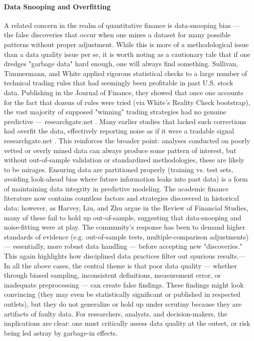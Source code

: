 \documentclass{article}
\begin{document}
\begin{appendices}
\paragraph{Data Snooping and Overfitting}
A related concern in the realm of quantitative finance is data-snooping bias --- the false discoveries that occur when one mines a dataset for many possible patterns without proper adjustment. While this is more of a methodological issue than a data quality issue per se, it is worth noting as a cautionary tale that if one dredges "garbage data" hard enough, one will always find something. Sullivan, Timmermann, and White \cite{Sullivan1999} applied rigorous statistical checks to a large number of technical trading rules that had seemingly been profitable in past U.S. stock data. Publishing in the Journal of Finance, they showed that once one accounts for the fact that dozens of rules were tried (via White's Reality Check bootstrap), the vast majority of supposed "winning" trading strategies had no genuine predictive ---
researchgate.net
. Many earlier studies that lacked such corrections had overfit the data, effectively reporting noise as if it were a tradable signal
researchgate.net
. This reinforces the broader point: analyses conducted on poorly vetted or overly mined data can always produce some pattern of interest, but without out-of-sample validation or standardized methodologies, these are likely to be mirages. Ensuring data are partitioned properly (training vs. test sets, avoiding look-ahead bias where future information leaks into past data) is a form of maintaining data integrity in predictive modeling. The academic finance literature now contains countless factors and strategies discovered in historical data; however, as Harvey, Liu, and Zhu \cite{Harvey2016} argue in the Review of Financial Studies, many of these fail to hold up out-of-sample, suggesting that data-snooping and noise-fitting were at play. The community's response has been to demand higher standards of evidence (e.g. out-of-sample tests, multiple-comparison adjustments) --- essentially, more robust data handling --- before accepting new "discoveries." This again highlights how disciplined data practices filter out spurious results.---
In all the above cases, the central theme is that poor data quality --- whether through biased sampling, inconsistent definitions, measurement error, or inadequate preprocessing --- can create false findings. These findings might look convincing (they may even be statistically significant or published in respected outlets), but they do not generalize or hold up under scrutiny because they are artifacts of faulty data. For researchers, analysts, and decision-makers, the implications are clear: one must critically assess data quality at the outset, or risk being led astray by garbage-in effects.


\end{appendices}
\end{document}
